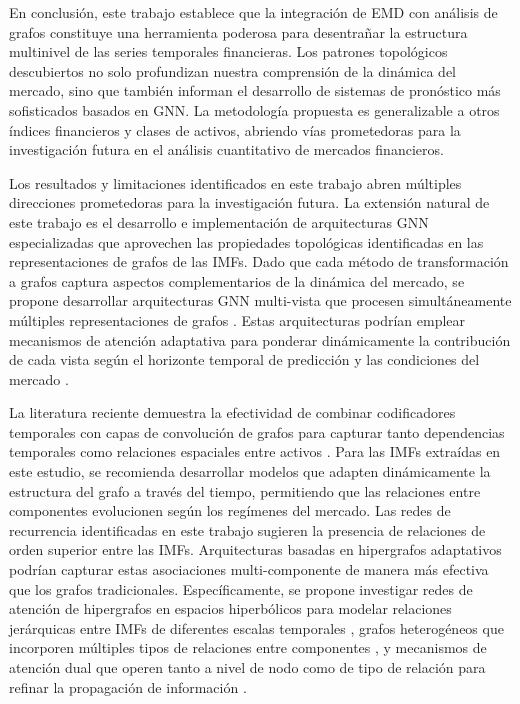 \documentclass[11pt,a4paper]{article}
\begin{document}
En conclusión, este trabajo establece que la integración de EMD con análisis de grafos constituye una herramienta poderosa para desentrañar la estructura multinivel de las series temporales financieras. Los patrones topológicos descubiertos no solo profundizan nuestra comprensión de la dinámica del mercado, sino que también informan el desarrollo de sistemas de pronóstico más sofisticados basados en GNN. La metodología propuesta es generalizable a otros índices financieros y clases de activos, abriendo vías prometedoras para la investigación futura en el análisis cuantitativo de mercados financieros.

Los resultados y limitaciones identificados en este trabajo abren múltiples direcciones prometedoras para la investigación futura. La extensión natural de este trabajo es el desarrollo e implementación de arquitecturas GNN especializadas que aprovechen las propiedades topológicas identificadas en las representaciones de grafos de las IMFs. Dado que cada método de transformación a grafos captura aspectos complementarios de la dinámica del mercado, se propone desarrollar arquitecturas GNN multi-vista que procesen simultáneamente múltiples representaciones de grafos \citep{liu2023multimodal, wang2023hatr}. Estas arquitecturas podrían emplear mecanismos de atención adaptativa para ponderar dinámicamente la contribución de cada vista según el horizonte temporal de predicción y las condiciones del mercado \citep{su2024attention}.

La literatura reciente demuestra la efectividad de combinar codificadores temporales con capas de convolución de grafos para capturar tanto dependencias temporales como relaciones espaciales entre activos \citep{liu2023multimodal, wang2023hatr, jin2023temporal}. Para las IMFs extraídas en este estudio, se recomienda desarrollar modelos que adapten dinámicamente la estructura del grafo a través del tiempo, permitiendo que las relaciones entre componentes evolucionen según los regímenes del mercado. Las redes de recurrencia identificadas en este trabajo sugieren la presencia de relaciones de orden superior entre las IMFs. Arquitecturas basadas en hipergrafos adaptativos \citep{su2024attention, agarwal2022think} podrían capturar estas asociaciones multi-componente de manera más efectiva que los grafos tradicionales. Específicamente, se propone investigar redes de atención de hipergrafos en espacios hiperbólicos para modelar relaciones jerárquicas entre IMFs de diferentes escalas temporales \citep{agarwal2022think}, grafos heterogéneos que incorporen múltiples tipos de relaciones entre componentes \citep{jin2023temporal}, y mecanismos de atención dual que operen tanto a nivel de nodo como de tipo de relación para refinar la propagación de información \citep{wang2023hatr}.
\end{document}
